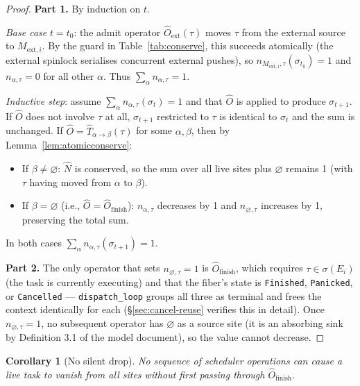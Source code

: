 \documentclass[11pt,a4paper]{report}
\newtheorem{corollary}[theorem]{Corollary}
\newcommand{\Num}{\hat{N}}
\newcommand{\Trf}[2]{\hat{T}_{#1 \to #2}}
\newcommand{\code}[1]{\texttt{#1}}
\begin{document}
\begin{proof}
\textbf{Part 1.}  By induction on $t$.

\emph{Base case} $t = t_0$: the admit operator
$\hat{O}_{\text{ext}}(\tau)$ moves $\tau$ from the external source to
$M_{\text{ext},i}$.  By the guard in Table~\ref{tab:conserve}, this
succeeds atomically (the external spinlock serialises concurrent
external pushes), so $n_{M_{\text{ext},i},\tau}(\sigma_{t_0}) = 1$
and $n_{\alpha,\tau} = 0$ for all other $\alpha$.  Thus
$\sum_\alpha n_{\alpha,\tau} = 1$.

\emph{Inductive step}: assume $\sum_\alpha n_{\alpha,\tau}(\sigma_t)
= 1$ and that $\hat{O}$ is applied to produce $\sigma_{t+1}$.  If
$\hat{O}$ does not involve $\tau$ at all, $\sigma_{t+1}$ restricted to
$\tau$ is identical to $\sigma_t$ and the sum is unchanged.  If
$\hat{O} = \Trf{\alpha}{\beta}(\tau)$ for some $\alpha, \beta$, then
by Lemma~\ref{lem:atomicconserve}:
\begin{itemize}
  \item If $\beta \neq \varnothing$: $\Num$ is conserved, so the sum
        over all live sites plus $\varnothing$ remains 1 (with $\tau$
        having moved from $\alpha$ to $\beta$).
  \item If $\beta = \varnothing$ (i.e., $\hat{O} =
        \hat{O}_{\text{finish}}$): $n_{\alpha,\tau}$ decreases by 1
        and $n_{\varnothing,\tau}$ increases by 1, preserving the
        total sum.
\end{itemize}
In both cases $\sum_\alpha n_{\alpha,\tau}(\sigma_{t+1}) = 1$.

\textbf{Part 2.}  The only operator that sets
$n_{\varnothing,\tau} = 1$ is $\hat{O}_{\text{finish}}$, which
requires $\tau \in \sigma(E_i)$ (the task is currently executing) and
that the fiber's state is \code{Finished}, \code{Panicked}, or
\code{Cancelled} --- \code{dispatch\_loop} groups all three as
terminal and frees the context identically for each
(\S\ref{sec:cancel-reuse} verifies this in detail). Once
$n_{\varnothing,\tau} = 1$, no subsequent operator has $\varnothing$
as a source site (it is an absorbing sink by Definition 3.1 of the
model document), so the value cannot decrease.
\end{proof}

\begin{corollary}[No silent drop]
No sequence of scheduler operations can cause a live task to vanish
from all sites without first passing through $\hat{O}_{\text{finish}}$.
\end{corollary}
\end{document}
